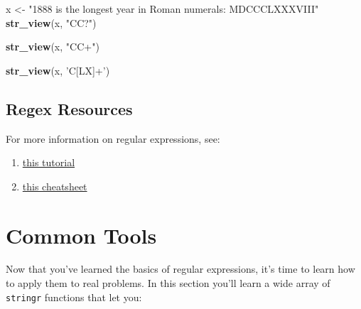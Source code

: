 \documentclass[]{book}
\newenvironment{Shaded}{\begin{snugshade}}{\end{snugshade}}
\newcommand{\KeywordTok}[1]{\textcolor[rgb]{0.13,0.29,0.53}{\textbf{#1}}}
\newcommand{\NormalTok}[1]{#1}
\newcommand{\StringTok}[1]{\textcolor[rgb]{0.31,0.60,0.02}{#1}}
\providecommand{\tightlist}{%
  \setlength{\itemsep}{0pt}\setlength{\parskip}{0pt}}
\begin{document}
\begin{Shaded}
\begin{Highlighting}[]
\NormalTok{x <-}\StringTok{ "1888 is the longest year in Roman numerals: MDCCCLXXXVIII"}
\KeywordTok{str_view}\NormalTok{(x, }\StringTok{"CC?"}\NormalTok{)}
\end{Highlighting}
\end{Shaded}

\hypertarget{htmlwidget-21c7483268bafca56cec}{}

\begin{Shaded}
\begin{Highlighting}[]
\KeywordTok{str_view}\NormalTok{(x, }\StringTok{"CC+"}\NormalTok{)}
\end{Highlighting}
\end{Shaded}

\hypertarget{htmlwidget-1834a22cd196f3aa03a1}{}

\begin{Shaded}
\begin{Highlighting}[]
\KeywordTok{str_view}\NormalTok{(x, }\StringTok{'C[LX]+'}\NormalTok{)}
\end{Highlighting}
\end{Shaded}

\hypertarget{htmlwidget-28515d92cb327f90c9eb}{}

\hypertarget{regex-resources}{%
\subsection{Regex Resources}\label{regex-resources}}

For more information on regular expressions, see:

\begin{enumerate}
\def\labelenumi{\arabic{enumi}.}
\tightlist
\item
  \href{http://regextutorials.com/}{this tutorial}
\item
  \href{https://medium.com/factory-mind/regex-tutorial-a-simple-cheatsheet-by-examples-649dc1c3f285}{this cheatsheet}
\end{enumerate}

\hypertarget{common-tools}{%
\section{Common Tools}\label{common-tools}}

Now that you've learned the basics of regular expressions, it's time to learn how to apply them to real problems. In this section you'll learn a wide array of \texttt{stringr} functions that let you:
\end{document}
